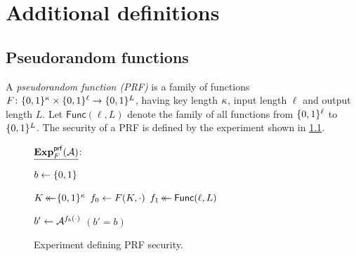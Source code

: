 \chapter{Additional definitions}\label{sec:other_definitions}


\begingroup
\hypersetup{linkcolor=black}
\minitoc
\endgroup


\section{Pseudorandom functions}\label{sec:other_definitions:PRF}


A \emph{pseudorandom function (PRF)} is a family of functions $F \colon \lbrace 0, 1 \rbrace^\kappa \times \lbrace 0, 1 \rbrace^\ell \to \lbrace 0, 1 \rbrace^L$,
having key length $\kappa$,
input length $\ell$ and output length $L$.
Let $\mathsf{Func}(\ell, L)$ denote the family of all functions from $\lbrace 0, 1 \rbrace^\ell$ to $\lbrace 0, 1 \rbrace^L$.
The security of a PRF is defined by the experiment shown in \cref{fig:PRF_security_experiment}.

\begin{figure}



\begin{adjustbox}{margin*=2ex,frame,center}
	\begin{minipage}[t]{0.5\textwidth}
			$\underline{\mathbf{Exp}_{F}^{\mathsf{prf}}(\mathcal{A})}$: 
			\begin{algorithmic}[1]
			
				\State $b \gets \lbrace 0, 1 \rbrace$

				\State $K \operatorname{\leftarrow\mathrel{\mkern-14mu}\leftarrow} \lbrace 0, 1 \rbrace^\kappa$				
				\State $f_0 \gets F(K, \cdot)$
				\State $f_1 \operatorname{\leftarrow\mathrel{\mkern-14mu}\leftarrow} \mathsf{Func}(\ell, L)$

				\State
				\State $b' \gets \mathcal{A}^{f_b(\cdot)}$ 
				\State \Return $(b' = b)$
		
	
			\end{algorithmic}
	\end{minipage}
\end{adjustbox}

\caption{Experiment defining PRF security.}
\label{fig:PRF_security_experiment}

\end{figure}

